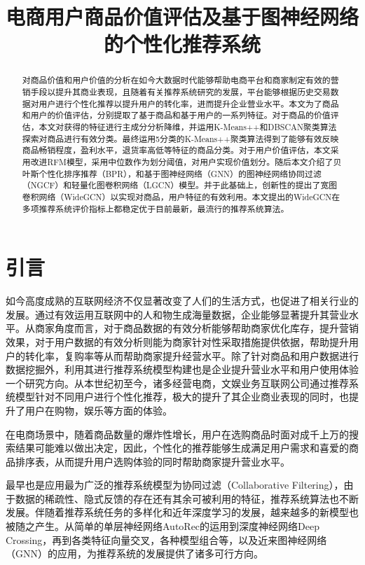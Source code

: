 \documentclass[lang=cn,11pt,a4paper,cite=authoryear]{elegantpaper}
\title{电商用户商品价值评估及基于图神经网络的个性化推荐系统}
\author{}
\institute{}
\date{}
\begin{document}
\maketitle





\begin{abstract}
  对商品价值和用户价值的分析在如今大数据时代能够帮助电商平台和商家制定有效的营销手段以提升其商业表现，且随着有关推荐系统研究的发展，平台能够根据历史交易数据对用户进行个性化推荐以提升用户的转化率，进而提升企业营业水平。本文为了商品和用户的价值评估，分别提取了基于商品和基于用户的一系列特征。对于商品的价值评估，本文对获得的特征进行主成分分析降维，并运用K-Means++和DBSCAN聚类算法探索对商品进行有效分类。最终运用5分类的K-Means++聚类算法得到了能够有效反映商品畅销程度，盈利水平，退货率高低等特征的商品分类。对于用户价值评估，本文采用改进RFM模型，采用中位数作为划分阈值，对用户实现价值划分。随后本文介绍了贝叶斯个性化排序推荐（BPR），和基于图神经网络（GNN）的图神经网络协同过滤（NGCF）和轻量化图卷积网络（LGCN）模型。并于此基础上，创新性的提出了宽图卷积网络（WideGCN）以实现对商品，用户特征的有效利用。本文提出的WideGCN在多项推荐系统评价指标上都稳定优于目前最新，最流行的推荐系统算法。
\end{abstract}

\newpage
\tableofcontents

\newpage

\section{引言}
如今高度成熟的互联网经济不仅显著改变了人们的生活方式，也促进了相关行业的发展。通过有效运用互联网中的人和物生成海量数据，企业能够显著提升其营业水平。从商家角度而言，对于商品数据的有效分析能够帮助商家优化库存，提升营销效果，对于用户数据的有效分析则能为商家针对性采取措施提供依据，帮助提升用户的转化率，复购率等从而帮助商家提升经营水平。除了针对商品和用户数据进行数据挖掘外，利用其进行推荐系统模型构建也是企业提升营业水平和用户使用体验一个研究方向。从本世纪初至今，诸多经营电商，文娱业务互联网公司通过推荐系统模型针对不同用户进行个性化推荐，极大的提升了其企业商业表现的同时，也提升了用户在购物，娱乐等方面的体验。

在电商场景中，随着商品数量的爆炸性增长，用户在选购商品时面对成千上万的搜索结果可能难以做出决定，因此，个性化的推荐能够生成满足用户需求和喜爱的商品排序表，从而提升用户选购体验的同时帮助商家提升营业水平。

最早也是应用最为广泛的推荐系统模型为协同过滤（Collaborative Filtering），由于数据的稀疏性、隐式反馈的存在还有其余可被利用的特征，推荐系统算法也不断发展。伴随着推荐系统任务的多样化和近年深度学习的发展，越来越多的新模型也被随之产生。从简单的单层神经网络AutoRec\cite{sedhain_autorec_2015}的运用到深度神经网络Deep Crossing\cite{shan_deep_2016}，再到各类特征向量交叉，各种模型组合等，以及近来图神经网络（GNN）的应用\cite{wu_session-based_2019}，为推荐系统的发展提供了诸多可行方向。
\end{document}
